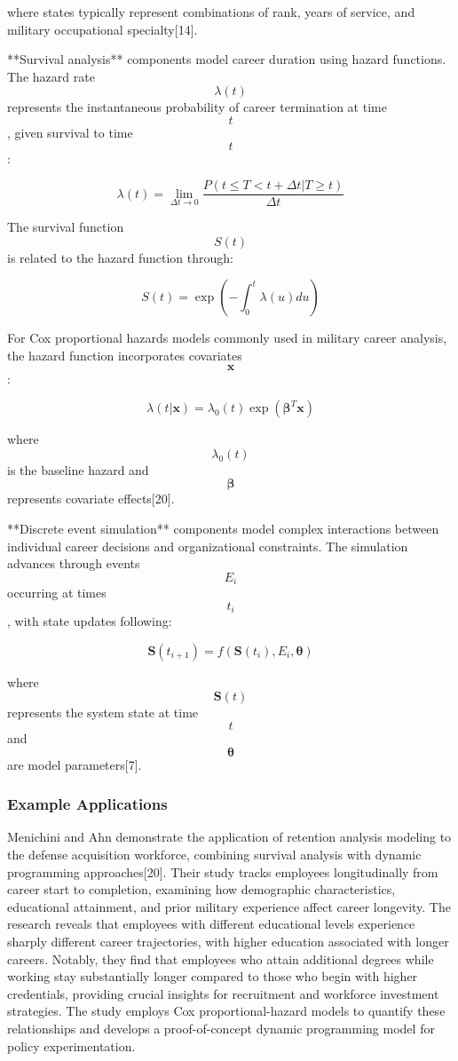 \documentclass[main.tex]{subfiles}
\begin{document}
where states typically represent combinations of rank, years of service, and military occupational specialty[14].

**Survival analysis** components model career duration using hazard functions. The hazard rate $$\lambda(t)$$ represents the instantaneous probability of career termination at time $$t$$, given survival to time $$t$$:

$$\lambda(t) = \lim_{\Delta t \to 0} \frac{P(t \leq T < t + \Delta t | T \geq t)}{\Delta t}$$

The survival function $$S(t)$$ is related to the hazard function through:

$$S(t) = \exp\left(-\int_0^t \lambda(u) du\right)$$

For Cox proportional hazards models commonly used in military career analysis, the hazard function incorporates covariates $$\mathbf{x}$$:

$$\lambda(t|\mathbf{x}) = \lambda_0(t) \exp(\boldsymbol{\beta}^T \mathbf{x})$$

where $$\lambda_0(t)$$ is the baseline hazard and $$\boldsymbol{\beta}$$ represents covariate effects[20].

**Discrete event simulation** components model complex interactions between individual career decisions and organizational constraints. The simulation advances through events $$E_i$$ occurring at times $$t_i$$, with state updates following:

$$\mathbf{S}(t_{i+1}) = f(\mathbf{S}(t_i), E_i, \boldsymbol{\theta})$$

where $$\mathbf{S}(t)$$ represents the system state at time $$t$$ and $$\boldsymbol{\theta}$$ are model parameters[7].

\subsubsection{Example Applications}

Menichini and Ahn demonstrate the application of retention analysis modeling to the defense acquisition workforce, combining survival analysis with dynamic programming approaches[20]. Their study tracks employees longitudinally from career start to completion, examining how demographic characteristics, educational attainment, and prior military experience affect career longevity. The research reveals that employees with different educational levels experience sharply different career trajectories, with higher education associated with longer careers. Notably, they find that employees who attain additional degrees while working stay substantially longer compared to those who begin with higher credentials, providing crucial insights for recruitment and workforce investment strategies. The study employs Cox proportional-hazard models to quantify these relationships and develops a proof-of-concept dynamic programming model for policy experimentation.
\end{document}
